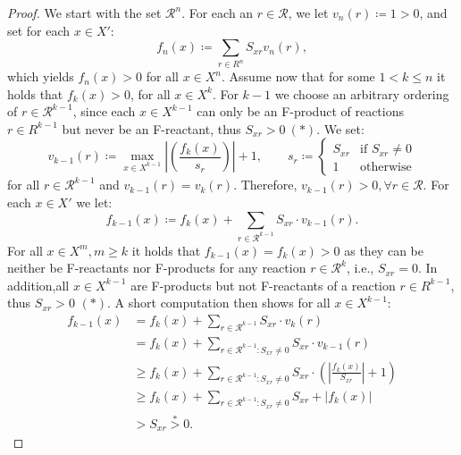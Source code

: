 \documentclass[pdflatex]{sn-jnl}
\theoremstyle{thmstyleone}%
\theoremstyle{examplesty}%
\theoremstyle{thmstylethree}%
\newcommand{\SM}{S}
\newcommand{\CR}[0]{\mathcal{R}}
\begin{document}
{\begin{proof}
We start with the set $\CR^n$. For each an $r\in \CR$, we let $v_n(r)\coloneqq
1>0$, and set for each $x\in X'$:
\begin{equation}
    \label{eq:update-f}
   	f_n(x) \coloneqq \sum_{r\in R^n} \SM_{xr} v_n(r),
\end{equation}
which yields $f_n(x)>0$ for all $x\in X^n$. Assume now that for some
$1< k\leq n$ it holds that $f_k(x)>0$, for all $x\in X^k$. For $k-1$ we 
choose an arbitrary ordering of $r\in \CR^{k-1}$, since each $x\in X^{k-1}$ 
can only be an F-product of reactions $r\in R^{k-1}$ but never be an F-reactant,
thus $S_{xr}>0 \ (*)$.
We set:
\begin{equation}
    v_{k-1}(r) \coloneqq  \max_{x\in X^{k-1}}\left\vert
    \left(\frac{f_{k}(x)}{s_{r}}\right)\right \vert + 1,\qquad
    s_{r}\coloneqq \begin{cases}\SM_{xr} & \text{if } \SM_{xr}\neq 0 \\ 1 &
      \text{otherwise} \end{cases}
  \end{equation}
  for all $r\in \CR^{k-1}$ and $v_{k-1}(r)=v_{k}(r)$. Therefore, $v_{k-1}(r)>0, \forall r\in \CR$. 
  For each $x\in X'$ we let: 
  \begin{equation}
    f_{k-1}(x) \coloneqq f_k(x) + \sum_{r\in \CR^{k-1}} \SM_{xr} \cdot v_{k-1}(r).
  \end{equation}	
   For all $x\in X^m, m\geq k$ it holds that $f_{k-1}(x)=f_k(x)>0$ as they can be neither be F-reactants nor F-products for any reaction $r\in \CR^k$, i.e., $S_{xr}=0$. In addition,all $x\in X^{k-1}$ are F-products but not F-reactants of a reaction $r\in R^{k-1}$, thus $S_{xr}>0$ $(*)$. A short computation then shows for all $x\in X^{k-1}$:
   \begin{equation}
   	\begin{split}
	   	f_{k-1}(x) & = f_k(x) + \sum_{r\in \CR^{k-1}} \SM_{xr} \cdot v_{k}(r)\\
			       & = f_k(x) + \sum_{r\in \CR^{k-1}: S_{xr}\neq 0} S_{xr} \cdot  v_{k-1}(r)\\
			       & \geq f_k(x) + \sum_{r\in \CR^{k-1}: S_{xr}\neq 0} S_{xr} \cdot  \left(\left \vert \frac{f_k(x)}{S_{xr}}  \right \vert +1\right)  \\
			       & \geq f_k(x) + \sum_{r\in \CR^{k-1}: S_{xr}\neq 0}  S_{xr} + \left \vert f_k(x) \right\vert\\
			       & > S_{xr} \overset{*}{>} 0.
	\end{split}
   \end{equation}

\end{proof}}
\end{document}
